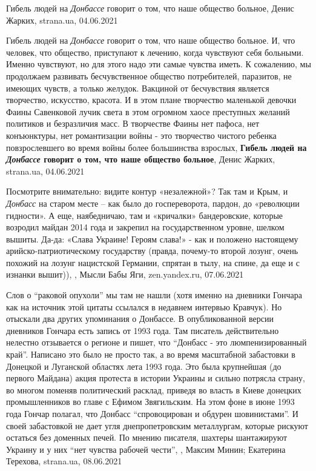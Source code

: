 Гибель людей на \emph{Донбассе} говорит о том, что наше общество больное,
Денис Жарких, strana.ua, 04.06.2021

Гибель людей на \emph{Донбассе} говорит о том, что наше общество больное. И, что
человек, что общество, приступают к лечению, когда чувствуют себя больными.
Именно чувствуют, но для этого надо эти самые чувства иметь. К сожалению, мы
продолжаем развивать бесчувственное общество потребителей, паразитов, не
имеющих чувств, а только желудок.  Вакциной от бесчувствия является творчество,
искусство, красота. И в этом плане творчество маленькой девочки Фаины
Савенковой лучик света в этом огромном хаосе преступных желаний политиков и
безразличия масс. В творчестве Фаины нет пафоса, нет конъюнктуры, нет
романтизации войны - это творчество чистого ребенка повзрослевшего во время
войны более большинства взрослых,
\textbf{Гибель людей на \emph{Донбассе} говорит о том, что наше общество больное},
Денис Жарких, strana.ua, 04.06.2021

Посмотрите внимательно: видите контур «незалежной»? Так там и Крым, и \emph{Донбасс}
на старом месте – как было до госпереворота, пардон, до «революции гидности». А
еще, наябедничаю, там и «кричалки» бандеровские, которые возродил майдан 2014
года и закрепил на государственном уровне, шелком вышиты. Да-да: «Слава
Украине! Героям слава!» - как и положено настоящему арийско-патриотическому
государству (правда, почему-то второй лозунг, очень похожий на лозунг
нацистской Германии, спрятан в тылу, на спине, да еще и с изнанки вышит)),
, Мысли Бабы Яги, zen.yandex.ru, 07.06.2021

Слов о \enquote{раковой опухоли} мы там не нашли (хотя именно на дневники Гончара как
на источник этой цитаты ссылался в недавнем интервью Кравчук). Но отыскали два
других упоминания о Донбассе.  В опубликованной версии дневников Гончара есть
запись от 1993 года. Там писатель действительно нелестно отзывается о регионе и
пишет, что \enquote{Донбасс - это люмпенизированный край}.  Написано это было не просто
так, а во время масштабной забастовки в Донецкой и Луганской областях лета 1993
года. Это была крупнейшая (до первого Майдана) акция протеста в истории Украины
и сильно потрясла страну, во многом поменяв политический расклад, приведя во
власть в Киеве донецких промышленников во главе с Ефимом Звягильским.  На этом
фоне в июне 1993 года Гончар полагал, что Донбасс \enquote{спровоцирован и обдурен
шовинистами}. И своей забастовкой не дает угля днепропетровским металлургам,
которые рискуют остаться без доменных печей.  По мнению писателя, шахтеры
шантажируют Украину и у них \enquote{нет чувства рабочей чести},
,
Максим Минин; Екатерина Терехова, strana.ua, 08.06.2021

